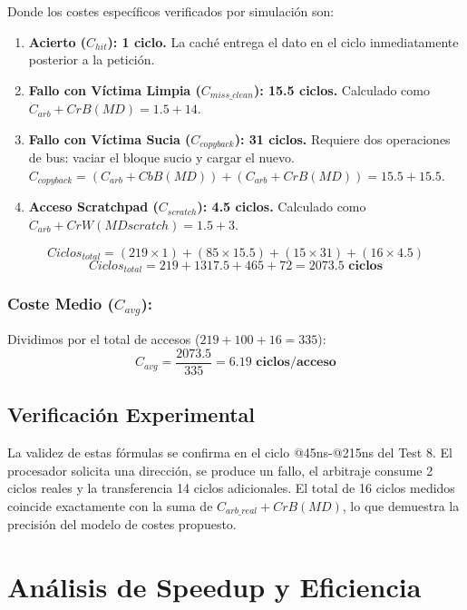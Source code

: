 \documentclass[12pt,a4paper]{article}
\begin{document}
Donde los costes específicos verificados por simulación son:
\begin{enumerate}
    \item \textbf{Acierto ($C_{hit}$): 1 ciclo.} La caché entrega el dato en el ciclo inmediatamente posterior a la petición.
    
    \item \textbf{Fallo con Víctima Limpia ($C_{miss\_clean}$): 15.5 ciclos.}
    Calculado como $C_{arb} + CrB(MD) = 1.5 + 14$.
    \newpage
    
    \item \textbf{Fallo con Víctima Sucia ($C_{copyback}$): 31 ciclos.}
    Requiere dos operaciones de bus: vaciar el bloque sucio y cargar el nuevo.
    $C_{copyback} = (C_{arb} + CbB(MD)) + (C_{arb} + CrB(MD)) = 15.5 + 15.5$.
    
    \item \textbf{Acceso Scratchpad ($C_{scratch}$): 4.5 ciclos.}
    Calculado como $C_{arb} + CrW(MDscratch) = 1.5 + 3$.
\end{enumerate}

$$Ciclos_{total} = (219 \times 1) + (85 \times 15.5) + (15 \times 31) + (16 \times 4.5)$$ $$Ciclos_{total} = 219 + 1317.5 + 465 + 72 = \mathbf{2073.5 \text{ ciclos}}$$

\subsubsection{Coste Medio ($C_{avg}$):}
Dividimos por el total de accesos ($219+100+16 = 335$): $$C_{avg} = \frac{2073.5}{335} = \mathbf{6.19 \text{ ciclos/acceso}}$$

\subsection{Verificación Experimental}

La validez de estas fórmulas se confirma en el ciclo @45ns-@215ns del Test 8. El procesador solicita una dirección, se produce un fallo, el arbitraje consume 2 ciclos reales y la transferencia 14 ciclos adicionales. El total de 16 ciclos medidos coincide exactamente con la suma de $C_{arb\_real} + CrB(MD)$, lo que demuestra la precisión del modelo de costes propuesto.


\section{Análisis de Speedup y Eficiencia}
\end{document}
